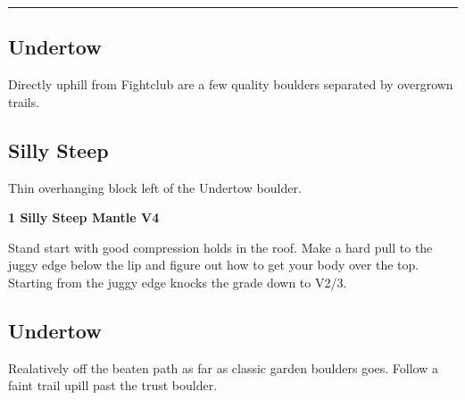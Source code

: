 \rule{\textwidth}{1pt}
\begin{multicols}{2}
		\section{Undertow}\label{sa:Undertow}
	\begin{minipage}{\columnwidth}
	Directly uphill from Fightclub are a few quality boulders separated by overgrown trails.
	\end{minipage}
			\subsection*{Silly Steep}\label{bf:Silly Steep}
			\begin{minipage}{\columnwidth}
			Thin overhanging block left of the Undertow boulder.
			\end{minipage}
			

					\begin{minipage}{\linewidth}	
					\label{rt:Silly Steep Mantle}\colorbox{RoyalBlue!20}{\textbf{1 Silly Steep Mantle V4 \ding{72}   }}
					\begin{adjustwidth}{0.5cm}{}				
					Stand start with good compression holds in the roof. Make a hard pull to the juggy edge below the lip and figure out how to get your body over the top. Starting from the juggy edge knocks the grade down to V2/3.
					\end{adjustwidth}
					\end{minipage}
			\subsection*{Undertow}\label{bf:Undertow}
			\begin{minipage}{\columnwidth}
			Realatively off the beaten path as far as classic garden boulders goes. Follow a faint trail upill past the trust boulder.
			\end{minipage}
			
\label{pt:Riptide}


\end{multicols}
